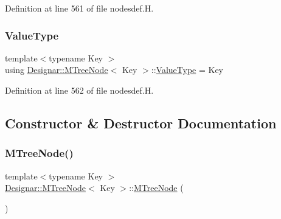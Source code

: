 Definition at line 561 of file nodesdef.\+H.

\mbox{\label{class_designar_1_1_m_tree_node_a0f65c3ec41fb24ab7764c01cd949d6be}} 
\subsubsection{\texorpdfstring{Value\+Type}{ValueType}}
{\footnotesize\ttfamily template$<$typename Key $>$ \\
using \hyperlink{class_designar_1_1_m_tree_node}{Designar\+::\+M\+Tree\+Node}$<$ Key $>$\+::\hyperlink{class_designar_1_1_m_tree_node_a0f65c3ec41fb24ab7764c01cd949d6be}{Value\+Type} =  Key}



Definition at line 562 of file nodesdef.\+H.



\subsection{Constructor \& Destructor Documentation}
\mbox{\label{class_designar_1_1_m_tree_node_a8312cbf8769f92de4348c69f9f7fce40}} 
\subsubsection{\texorpdfstring{M\+Tree\+Node()}{MTreeNode()}\hspace{0.1cm}{\footnotesize\ttfamily [1/3]}}
{\footnotesize\ttfamily template$<$typename Key $>$ \\
\hyperlink{class_designar_1_1_m_tree_node}{Designar\+::\+M\+Tree\+Node}$<$ Key $>$\+::\hyperlink{class_designar_1_1_m_tree_node}{M\+Tree\+Node} (\begin{DoxyParamCaption}{ }\end{DoxyParamCaption})\hspace{0.3cm}{\ttfamily [default]}}

\mbox{\label{class_designar_1_1_m_tree_node_a823994c2cdeba2768bdb10163f27a6b1}} 
